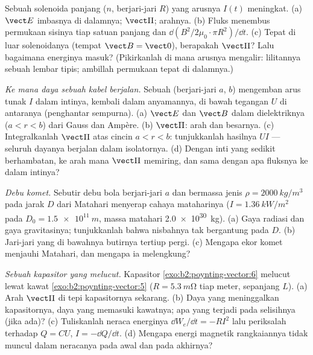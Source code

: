 \begin{exercise}[$\star\star$]\label{exo:b2:poynting-vector:7}
Sebuah solenoida panjang ($n$, berjari-jari $R$) yang arusnya $I(t)$ meningkat. (a)
$\vect E$ imbasnya di dalamnya; $\vect\Pi$; arahnya. (b) Fluks menembus
permukaan sisinya tiap satuan panjang dan $\dd(B^2/2\mu_0\cdot\pi R^2)/\dd t$. (c)
Tepat di luar solenoidanya (tempat $\vect B = \vect 0$), berapakah $\vect\Pi$?
Lalu bagaimana energinya masuk? (Pikirkanlah di mana arusnya mengalir:
lilitannya sebuah lembar tipis; ambillah permukaan tepat di dalamnya.)
\end{exercise}

\begin{exercise}[$\star\star$]\label{exo:b2:poynting-vector:8}
\emph{Ke mana daya sebuah kabel berjalan.} Sebuah  (berjari-jari $a$,
$b$) mengemban arus tunak $I$ dalam intinya, kembali dalam anyamannya, di bawah
tegangan $U$ di antaranya (penghantar sempurna). (a) $\vect E$ dan $\vect B$
dalam dielektriknya ($a < r < b$) dari Gauss dan Ampère. (b) $\vect\Pi$:
arah dan besarnya. (c) Integralkanlah $\vect\Pi$ atas cincin $a < r
< b$: tunjukkanlah hasilnya $UI$ --- seluruh dayanya berjalan dalam
isolatornya. (d) Dengan inti yang sedikit berhambatan, ke arah mana
$\vect\Pi$ memiring, dan sama dengan apa fluksnya ke dalam intinya?
\end{exercise}

\begin{exercise}[$\star\star$]\label{exo:b2:poynting-vector:9}
\emph{Debu komet.} Sebutir debu bola berjari-jari $a$ dan bermassa jenis
$\rho = \qty{2000}{kg/m^3}$ pada jarak $D$ dari Matahari menyerap
cahaya mataharinya ($I = \qty{1.36}{kW/m^2}$ pada $D_0 = \qty{1.5e11}{m}$, massa matahari
\qty{2.0e30}{kg}). (a) Gaya radiasi dan gaya gravitasinya; tunjukkanlah bahwa
nisbahnya tak bergantung pada $D$. (b) Jari-jari yang di bawahnya butirnya
tertiup pergi. (c) Mengapa ekor komet menjauhi Matahari, dan mengapa
ia melengkung?
\end{exercise}

\begin{exercise}[$\star\star\star$]\label{exo:b2:poynting-vector:10}
\emph{Sebuah kapasitor yang melucut.} Kapasitor
\cref{exo:b2:poynting-vector:6} melucut lewat kawat
\cref{exo:b2:poynting-vector:5} ($R = \qty{5.3}{m\ohm}$ tiap meter, sepanjang
$L$). (a) Arah $\vect\Pi$ di tepi kapasitornya sekarang. (b) Daya
yang meninggalkan kapasitornya, daya yang memasuki kawatnya; apa yang terjadi pada
selisihnya (jika ada)? (c) Tuliskanlah neraca energinya $\dd W_e/\dd t = -RI^2$
lalu periksalah terhadap $Q = CU$, $I = -\dd Q/\dd t$. (d) Mengapa
energi magnetik rangkaiannya tidak muncul dalam neracanya pada
awal dan pada akhirnya?
\end{exercise}

